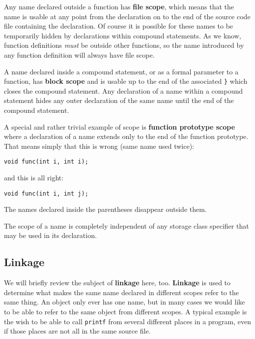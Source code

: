    Any name declared outside a function has \textbf{file scope}, which
    means that the name is usable at any point from the declaration on to
    the end of the source code file containing the declaration. Of course it
    is possible for these names to be temporarily hidden by declarations
    within compound statements. As we know, function definitions
    \textit{must} be outside other functions, so the name introduced by any
    function definition will always have file scope.


   A name declared inside a compound statement, or as a formal parameter
    to a function, has \textbf{block scope} and is usable up to the end of
    the associated \texttt{\}} which closes the compound statement. Any
    declaration of a name within a compound statement hides any outer
    declaration of the same name until the end of the compound
    statement.


   A special and rather trivial example of scope is \textbf{function
    prototype scope} where a declaration of a name extends only to the
    end of the function prototype. That means simply that this is wrong
    (same name used twice):


\begin{Verbatim}
void func(int i, int i);
\end{Verbatim}

   and this is all right:


\begin{Verbatim}
void func(int i, int j);
\end{Verbatim}

   The names declared inside the parentheses disappear outside them.


   The scope of a name is completely independent of any storage class
    specifier that may be used in its declaration.


  

  \subsection{Linkage}
   

   We will briefly review the subject of \textbf{linkage} here, too.
    \textbf{Linkage} is used to determine what makes the same name
    declared in different scopes refer to the same thing. An object only
    ever has one name, but in many cases we would like to be able to refer
    to the same object from different scopes. A typical example is the wish
    to be able to call \texttt{printf} from several different places in
    a program, even if those places are not all in the same source file.


